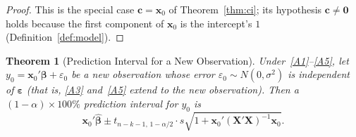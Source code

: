 \documentclass[14pt]{extarticle}
\theoremstyle{plain}
\newtheorem{theorem}{Theorem}[section]
\theoremstyle{definition}
\theoremstyle{remark}
\newcommand{\bX}{\mathbf{X}}
\newcommand{\bx}{\mathbf{x}}
\def\bb{\boldsymbol{\beta}}
\newcommand{\be}{\boldsymbol{\varepsilon}}
\def\bc{\mathbf{c}}
\newcommand{\bzero}{\mathbf{0}}
\begin{document}
\begin{proof}
This is the special case $\bc = \bx_0$ of Theorem~\ref{thm:ci}; its hypothesis $\bc \neq \bzero$ holds because the first component of $\bx_0$ is the intercept's $1$ (Definition~\ref{def:model}).
\end{proof}

\begin{theorem}[Prediction Interval for a New Observation]\label{thm:pred}
Under~\ref{A1}--\ref{A5}, let $y_0 = \bx_0'\bb + \varepsilon_0$ be a new observation whose error $\varepsilon_0 \sim N(0, \sigma^2)$ is independent of $\be$ (that is, \ref{A3} and~\ref{A5} extend to the new observation). Then a $(1-\alpha) \times 100\%$ prediction interval for $y_0$ is
\begin{equation}
\bx_0'\hat{\bb} \pm t_{n-k-1,\,1-\alpha/2} \cdot s\sqrt{1 + \bx_0'(\bX'\bX)^{-1}\bx_0}.
\end{equation}
\end{theorem}
\end{document}
